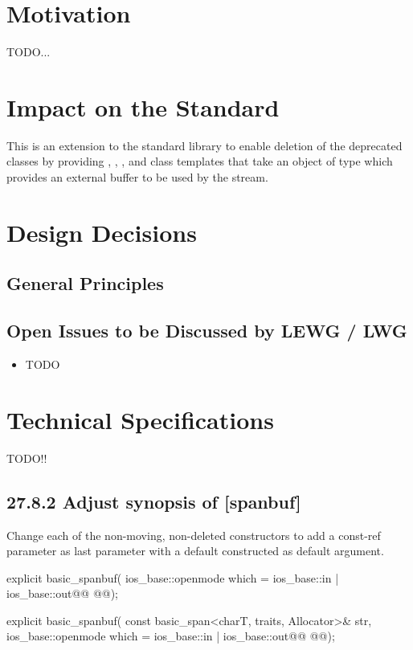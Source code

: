 \documentclass[ebook,11pt,article]{memoir}
\begin{document}
\chapter{Motivation}
TODO...
\begin{codeblock}
\end{codeblock}

\chapter{Impact on the Standard}
This is an extension to the standard library to enable deletion of the deprecated  classes by providing , , , and  class templates that take an object of type  which provides an external buffer to be used by the stream. 

\chapter{Design Decisions}
\section{General Principles}
\section{Open Issues to be Discussed by LEWG / LWG}
\begin{itemize}
\item TODO
\end{itemize}

\chapter{Technical Specifications}
TODO!! 
\section{27.8.2 Adjust synopsis of  [spanbuf]}
Change each of the non-moving, non-deleted constructors to add a const-ref  parameter as last parameter with a default constructed  as default argument. 
\begin{codeblock}
explicit basic_spanbuf(
        ios_base::openmode which = ios_base::in | ios_base::out@\ins{,}@
        @@);

explicit basic_spanbuf(
        const basic_span<charT, traits, Allocator>& str,
        ios_base::openmode which = ios_base::in | ios_base::out@\ins{,}@
        @@);
\end{codeblock}
\end{document}
